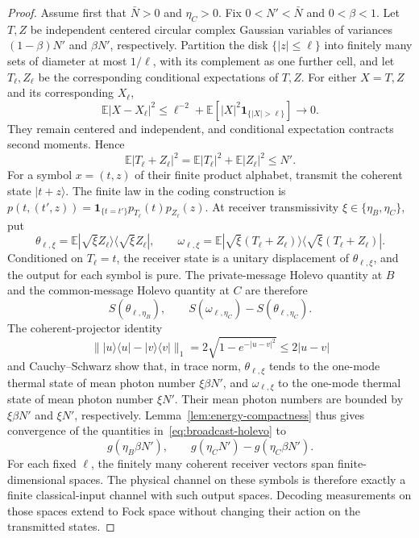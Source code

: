 \begin{proof}
Assume first that \(\bar N>0\) and \(\eta_C>0\). Fix
\(0<N'<\bar N\) and \(0<\beta<1\). Let \(T,Z\) be independent centered
circular complex Gaussian variables of variances \((1-\beta)N'\) and
\(\beta N'\), respectively. Partition the disk \(\{|z|\le\ell\}\)
into finitely many sets of diameter at most \(1/\ell\), with its
complement as one further cell, and let \(T_\ell,Z_\ell\) be the
corresponding conditional expectations of \(T,Z\). For either
\(X=T,Z\) and its corresponding \(X_\ell\),
\[
 \mathbb E|X-X_\ell|^2
 \le\ell^{-2}+\mathbb E\!\left[|X|^2\mathbf1_{\{|X|>\ell\}}\right]
 \longrightarrow0.
\]
They remain centered and independent, and
conditional expectation contracts second moments. Hence
\[
 \mathbb E|T_\ell+Z_\ell|^2
 =\mathbb E|T_\ell|^2+\mathbb E|Z_\ell|^2\le N'.
\]
For a symbol \(x=(t,z)\) of their finite product alphabet, transmit
the coherent state \(|t+z\rangle\). The finite law in the coding
construction is
\(p(t,(t',z))=\mathbf1_{\{t=t'\}}p_{T_\ell}(t)p_{Z_\ell}(z)\).
At receiver transmissivity
\(\xi\in\{\eta_B,\eta_C\}\), put
\[
 \theta_{\ell,\xi}
 =\mathbb E|\sqrt\xi Z_\ell\rangle\langle\sqrt\xi Z_\ell|,
 \qquad
 \omega_{\ell,\xi}
 =\mathbb E|\sqrt\xi(T_\ell+Z_\ell)\rangle
             \langle\sqrt\xi(T_\ell+Z_\ell)|.
\]
Conditioned on \(T_\ell=t\), the receiver state is a unitary
displacement of \(\theta_{\ell,\xi}\), and the output for each symbol
is pure. The private-message Holevo quantity at \(B\) and the
common-message Holevo quantity at \(C\) are therefore
\begin{equation}\label{eq:broadcast-holevo}
 S(\theta_{\ell,\eta_B}),\qquad
 S(\omega_{\ell,\eta_C})-S(\theta_{\ell,\eta_C}).
\end{equation}
The coherent-projector identity
\[
 \bigl\||u\rangle\langle u|-|v\rangle\langle v|\bigr\|_1
 =2\sqrt{1-e^{-|u-v|^2}}\le2|u-v|
\]
and Cauchy--Schwarz show that, in trace norm,
\(\theta_{\ell,\xi}\) tends to the one-mode thermal state of mean
photon number \(\xi\beta N'\), and \(\omega_{\ell,\xi}\) to the
one-mode thermal state of mean photon number \(\xi N'\). Their mean
photon numbers are bounded by \(\xi\beta N'\) and \(\xi N'\),
respectively. Lemma~\ref{lem:energy-compactness} thus gives convergence
of the quantities in~\eqref{eq:broadcast-holevo} to
\[
 g(\eta_B\beta N'),\qquad
 g(\eta_C N')-g(\eta_C\beta N').
\]
For each fixed \(\ell\), the finitely many coherent receiver vectors
span finite-dimensional spaces. The physical channel on these symbols
is therefore exactly a finite classical-input channel with such output
spaces. Decoding measurements on those spaces extend to Fock space
without changing their action on the transmitted states.


\end{proof}
